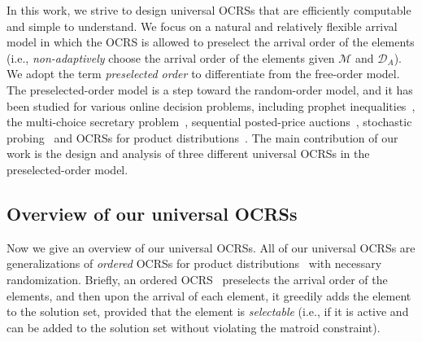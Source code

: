 \documentclass[11pt]{article}
\newcommand{\D}{\mathcal D}
\newcommand{\M}{{\mathcal M}}
\begin{document}
In this work, we strive to design universal OCRSs that are efficiently computable and simple to understand. We focus on a natural and relatively flexible arrival model in which the OCRS is allowed to preselect the arrival order of the elements (i.e., \emph{non-adaptively} choose the arrival order of the elements given $\M$ and $\D_A$). We adopt the term \emph{preselected order} to differentiate from the free-order model. The preselected-order model is a step toward the random-order model, and it has been studied for various online decision problems, including prophet inequalities~\citep{hill1983prophet,agrawal2020optimal,liu2021variable,peng2022order,bubna2023prophet}, the multi-choice secretary problem~\citep{hajiaghayi2022optimal}, sequential posted-price auctions~\citep{chawla2010multi,beyhaghi2018improved}, stochastic probing~\citep{gupta2013stochastic} and OCRSs for product distributions~\citep{chekuri2014submodular}. The main contribution of our work is the design and analysis of three different universal OCRSs in the preselected-order model.

\subsection{Overview of our universal OCRSs}
Now we give an overview of our universal OCRSs. All of our universal OCRSs are generalizations of \emph{ordered} OCRSs for product distributions~\citep{chekuri2014submodular,gupta2013stochastic} with necessary randomization. Briefly, an ordered OCRS~\citep[Definition 3.2]{gupta2013stochastic} preselects the arrival order of the elements, and then upon the arrival of each element, it greedily adds the element to the solution set, provided that the element is \emph{selectable} (i.e., if it is active and can be added to the solution set without violating the matroid constraint).
\end{document}
